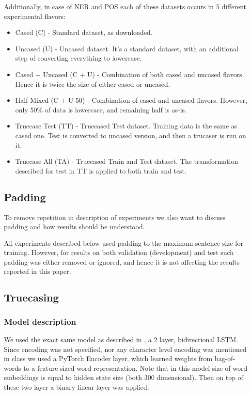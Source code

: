 \documentclass[11pt,a4paper]{article}
\begin{document}
Additionally, in case of NER and POS each of these datasets occurs in 5 different experimental flavors:
\begin{itemize}
    \item Cased (C) - Standard dataset, as downloaded.
    \item Uncased (U) - Uncased dataset. It's a standard dataset, with an additional step of converting everything to lowercase.
    \item Cased + Uncased (C + U) - Combination of both cased and uncased flavors. Hence it is twice the size of either cased or uncased.
    \item Half Mixed (C + U 50) - Combination of cased and uncased flavors. However, only 50\% of data is lowercase, and remaining half is as-is.
    \item Truecase Test (TT) - Truecased Test dataset. Training data is the same as cased one. Test is converted to uncased version, and then a trucaser is run on it.
    \item Truecase All (TA) - Truecased Train and Test dataset. The transformation described for test in TT is applied to both train and test.
\end{itemize}

\subsection{Padding}
To remove repetition in description of experiments we also want to discuss padding and how results should be understood.

All experiments described below used padding to the maximum sentence size for training. However, for results on both validation (development) and test such padding was either removed or ignored, and hence it is not affecting the results reported in this paper.

\subsection{Truecasing}
\label{sec:exp-truecase}

    \subsubsection{Model description}
    We used the exact same model as described in \cite{susanto-etal-2016-learning}, a 2 layer, bidirectional LSTM. Since encoding was not specified, nor any character level encoding was mentioned in class we used a PyTorch \cite{pytorch} Encoder layer, which learned weights from bag-of-words to a feature-sized word representation. Note that in this model size of word embeddings is equal to hidden state size (both 300 dimensional). Then on top of these two layer a binary linear layer was applied.
\end{document}
